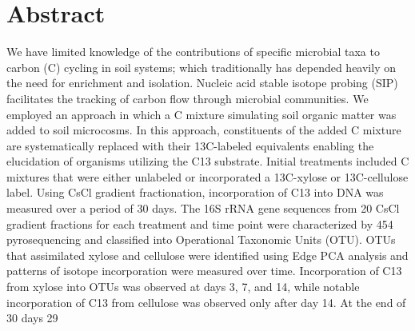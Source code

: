 \section{Abstract} 
We have limited knowledge of the contributions of specific microbial taxa to carbon (C) cycling in soil systems; which traditionally has depended heavily on the need for enrichment and isolation. Nucleic acid stable isotope probing (SIP) facilitates the tracking of carbon flow through microbial communities. We employed an approach in which a C mixture simulating soil organic matter was added to soil microcosms. In this approach, constituents of the added C mixture are systematically replaced with their 13C-labeled equivalents enabling the elucidation of organisms utilizing the C13 substrate. Initial treatments included C mixtures that were either unlabeled or incorporated a 13C-xylose or 13C-cellulose label.  Using CsCl gradient fractionation, incorporation of C13 into DNA was measured over a period of 30 days. The 16S rRNA gene sequences from 20 CsCl gradient fractions for each treatment and time point were characterized by 454 pyrosequencing and classified into Operational Taxonomic Units (OTU).  OTUs that assimilated xylose and cellulose were identified using Edge PCA analysis and patterns of isotope incorporation were measured over time. Incorporation of C13 from xylose into OTUs was observed at days 3, 7, and 14, while notable incorporation of C13 from cellulose was observed only after day 14. At the end of 30 days 29%